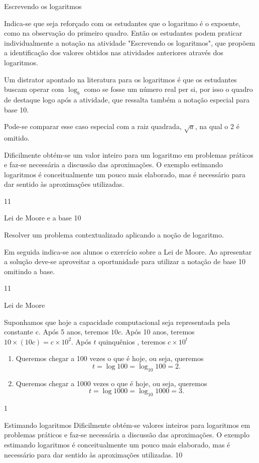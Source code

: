 \begin{sugestions}{Escrevendo os logaritmos}
{
	Indica-se que seja reforçado com os estudantes que o logaritmo é o expoente, como na observação do primeiro quadro. Então os estudantes podem praticar individualmente a notação na atividade "Escrevendo os logaritmos", que propõem a identificação dos valores obtidos nas atividades anteriores através dos logaritmos.


	Um distrator apontado na literatura para os logaritmos é que os estudantes buscam operar com $\log_b$ como se fosse um número real per si, por isso o quadro de destaque logo após a atividade, que ressalta também a notação especial para base 10.

	Pode-se comparar esse caso especial com a raiz quadrada, $\sqrt{a}$, na qual o 2 é omitido.

	Dificilmente obtém-se um valor inteiro para um logaritmo em problemas práticos e faz-se necessária a discussão das aproximações. O exemplo estimando logaritmos é conceitualmente um pouco mais elaborado, mas é necessário para dar sentido às aproximações utilizadas.
}
{1}{1}
\end{sugestions}
\begin{objectives}{Lei de Moore e a base 10}
{
	Resolver um problema contextualizado aplicando a noção de logaritmo.

	Em seguida indica-se aos alunos o exercício sobre a Lei de Moore. Ao apresentar a solução deve-se aproveitar a oportunidade para utilizar a notação de base 10 omitindo a base.
}{1}{1}
\end{objectives}
\begin{answer}{Lei de Moore}
{
	Suponhamos que hoje a capacidade computacional seja representada pela constante c. Após 5 anos, teremos $10c$. Após 10 anos, teremos $10 \times (10c) = c \times 10^2$. Após $t$ quinquênios , teremos $c \times 10^t$
	\begin{enumerate} 
	\item Queremos chegar a 100 vezes o que é hoje, ou seja, queremos
	$$
	t = \log 100 = \log_{10} 100  = 2.
	$$
	\item Queremos chegar a 1000 vezes o que é hoje, ou seja, queremos
	$$
	t = \log 1000 = \log_{10} 1000  = 3.
	$$
	\end{enumerate}
}{1}
\end{answer}
\clearmargin
\begin{sugestions}{Estimando logaritmos}
{
	Dificilmente obtém-se valores inteiros para logaritmos em problemas práticos e faz-se necessária a discussão das aproximações. O exemplo estimando logaritmos é conceitualmente um pouco mais elaborado, mas é necessário para dar sentido às aproximações utilizadas.
}{1}{0}
\end{sugestions}

